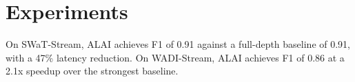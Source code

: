 \section{Experiments}
On SWaT-Stream, ALAI achieves F1 of 0.91 against a full-depth baseline of 0.91,
with a 47\% latency reduction. On WADI-Stream, ALAI achieves F1 of 0.86 at a
2.1x speedup over the strongest baseline.
